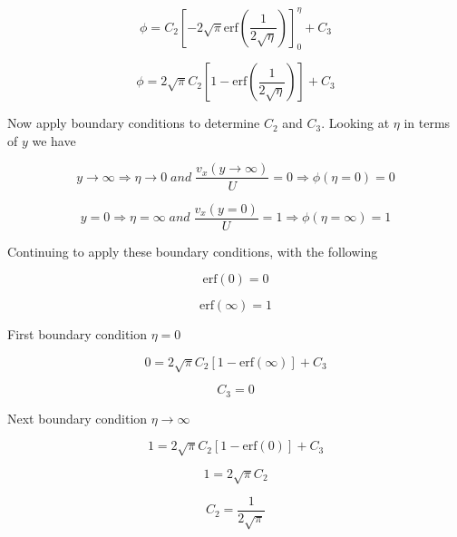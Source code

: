 \begin{equation*}
  \phi=C_{2}\left[-2\sqrt{\pi}\text{erf}\left(\frac{1}{2\sqrt{\eta}}\right)\right]_{0}^{\eta}+C_{3}
\end{equation*}

\begin{equation*}
  \phi=2\sqrt{\pi}C_{2}\left[1-\text{erf}\left(\frac{1}{2\sqrt{\eta}}\right)\right]+C_{3}
\end{equation*}

 Now apply boundary conditions to determine $C_{2}$ and $C_{3}$.
 Looking at $\eta$ in terms of $y$ we have

\begin{equation*}
  y\rightarrow\infty\Rightarrow\eta\rightarrow0\;and\;\frac{v_{x}(y\rightarrow\infty)}{U}=0\Rightarrow\phi(\eta=0)=0
\end{equation*}

\begin{equation*}
  y=0\Rightarrow\eta=\infty\;and\;\frac{v_{x}(y=0)}{U}=1\Rightarrow\phi(\eta=\infty)=1
\end{equation*}

Continuing to apply these boundary conditions, with the following

\begin{equation*}
  \text{erf}(0)=0
\end{equation*}

\begin{equation*}
  \text{erf}(\infty)=1
\end{equation*}

First boundary condition $\eta=0$

\begin{equation*}
  0=2\sqrt{\pi}C_{2}\left[1-\text{erf}(\infty)\right]+C_{3}
\end{equation*}

\begin{equation*}
  C_{3}=0
\end{equation*}

Next boundary condition $\eta\rightarrow\infty$

\begin{equation*}
  1=2\sqrt{\pi}C_{2}\left[1-\text{erf}(0)\right]+C_{3}
\end{equation*}

\begin{equation*}
  1=2\sqrt{\pi}C_{2}
\end{equation*}

\begin{equation*}
  C_{2}=\frac{1}{2\sqrt{\pi}}
\end{equation*}


